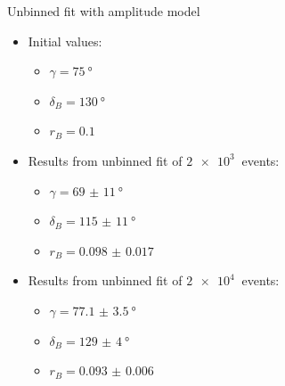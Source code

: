 \documentclass{beamer}
\begin{document}
\begin{frame}{Unbinned fit with amplitude model}
  \begin{itemize}
    \item{Initial values:}
    \begin{itemize}
      \item{$\gamma = \SI{75}{\degree}$}
      \item{$\delta_B = \SI{130}{\degree}$}
      \item{$r_B = \SI{0.1}{}$}
    \end{itemize}
    \item{Results from unbinned fit of $\SI{2e3}{}$ events:}
    \begin{itemize}
      \item{$\gamma = \SI{69(11)}{\degree}$}
      \item{$\delta_B = \SI{115(11)}{\degree}$}
      \item{$r_B = \SI{0.098(17)}{}$}
    \end{itemize}
    \item{Results from unbinned fit of $\SI{2e4}{}$ events:}
    \begin{itemize}
      \item{$\gamma = \SI{77.1(35)}{\degree}$}
      \item{$\delta_B = \SI{129(4)}{\degree}$}
      \item{$r_B = \SI{0.093(6)}{}$}
    \end{itemize}
  \end{itemize}
\end{frame}
\end{document}
